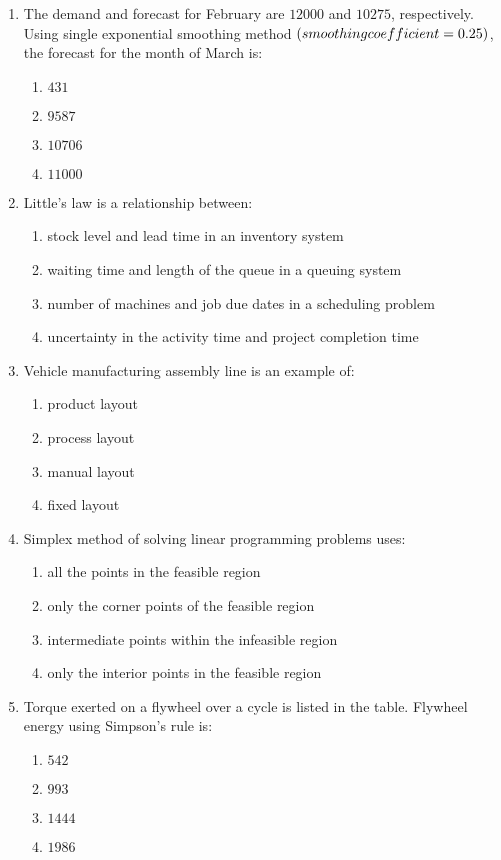 \documentclass[journal,12pt,twocolumn]{IEEEtran}
\theoremstyle{remark}
\begin{document}
\begin{enumerate}[start=14]
    \item The demand and forecast for February are $12000$ and $10275$, respectively. Using single exponential smoothing method $\left(smoothing coefficient = 0.25\right)$, the forecast for the month of March is:
    \begin{enumerate}
        \item $431$
        \item $9587$
        \item $10706$
        \item $11000$
    \end{enumerate}

    \item Little's law is a relationship between:
    \begin{enumerate}
        \item stock level and lead time in an inventory system
        \item waiting time and length of the queue in a queuing system
        \item number of machines and job due dates in a scheduling problem
        \item uncertainty in the activity time and project completion time
    \end{enumerate}

    \item Vehicle manufacturing assembly line is an example of:
    \begin{enumerate}
        \item product layout
        \item process layout
        \item manual layout
        \item fixed layout
    \end{enumerate}

    \item Simplex method of solving linear programming problems uses:
    \begin{enumerate}
        \item all the points in the feasible region
        \item only the corner points of the feasible region
        \item intermediate points within the infeasible region
        \item only the interior points in the feasible region
    \end{enumerate}

    \item Torque exerted on a flywheel over a cycle is listed in the table. Flywheel energy  using Simpson's rule is:
   
    \begin{enumerate}
        \item $542$
        \item $993$
        \item $1444$
        \item $1986$
    \end{enumerate}
    


\end{enumerate}
\end{document}
